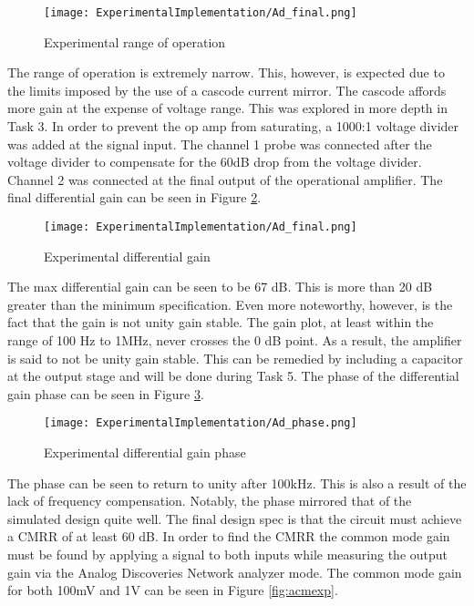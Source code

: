 \begin{figure}[H]
	\begin{center}
		\texttt{[image: ExperimentalImplementation/Ad\_final.png]}
		\caption{Experimental range of operation}
		\label{fig:vtc}
	\end{center}
\end{figure}

The range of operation is extremely narrow. This, however, is expected due to the limits imposed by the use of a cascode current mirror. The cascode affords more gain at the expense of voltage range. This was explored in more depth in Task 3. In order to prevent the op amp from saturating, a 1000:1 voltage divider was added at the signal input. The channel 1 probe was connected after the voltage divider to compensate for the 60dB drop from the voltage divider. Channel 2 was connected at the final output of the operational amplifier. The final differential gain can be seen in Figure \ref{fig:finalAD}.

\begin{figure}[H]
	\begin{center}
		\texttt{[image: ExperimentalImplementation/Ad\_final.png]}
		\caption{Experimental differential gain}
		\label{fig:finalAD}
	\end{center}
\end{figure}

The max differential gain can be seen to be 67 dB. This is more than 20 dB greater than the minimum specification. Even more noteworthy, however, is the fact that the gain is not unity gain stable. The gain plot, at least within the range of 100 Hz to 1MHz, never crosses the 0 dB point. As a result, the amplifier is said to not be unity gain stable. This can be remedied by including a capacitor at the output stage and will be done during Task 5. The phase of the differential gain phase can be seen in Figure \ref{fig:adphase}. 

\begin{figure}[H]
	\begin{center}
		\texttt{[image: ExperimentalImplementation/Ad\_phase.png]}
		\caption{Experimental differential gain phase}
		\label{fig:adphase}
	\end{center}
\end{figure}

The phase can be seen to return to unity after 100kHz. This is also a result of the lack of frequency compensation. Notably, the phase mirrored that of the simulated design quite well. The final design spec is that the circuit must achieve a CMRR of at least 60 dB. In order to find the CMRR the common mode gain must be found by applying a signal to both inputs while measuring the output gain via the Analog Discoveries Network analyzer mode. The common mode gain for both 100mV and 1V can be seen in Figure \ref{fig:acmexp}.


